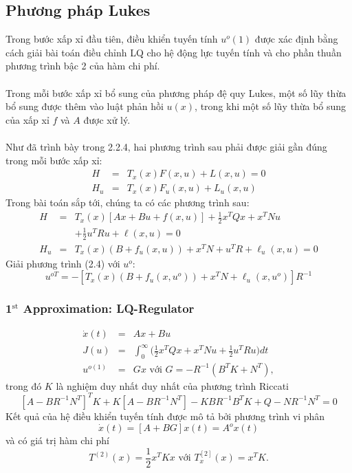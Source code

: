 \documentclass[12pt,a4paper]{report}
\begin{document}
\subsection{Phương pháp Lukes} Trong bước xấp xỉ đầu tiên, điều khiển tuyến tính $u^o(1)$ được xác định bằng cách giải bài toán điều chỉnh LQ cho hệ động lực tuyến tính và cho phần thuần phương trình bậc 2 của hàm chi phí. \\\\ Trong mỗi bước xấp xỉ bổ sung của phương pháp đệ quy Lukes, một số lũy thừa bổ sung được thêm vào luật phản hồi $u(x)$, trong khi một số lũy thừa bổ sung của xấp xỉ $f$ và $A$ được xử lý.\\\\ Như đã trình bày trong 2.2.4, hai phương trình sau phải được giải gần đúng trong mỗi bước xấp xỉ: \begin{eqnarray}
	H &=& T_x(x)F(x, u) + L(x, u) = 0\\ H_u &=& T_x(x)F_u(x, u) + L_u(x, u)
\end{eqnarray} Trong bài toán sắp tới, chúng ta có các phương trình sau: \begin{eqnarray}
	H &=&T_x(x)[Ax+Bu+f(x, u)] + \frac{1}{2}x^TQx + x^TNu \nonumber\\ && + \frac{1}{2}u^TRu + \ell(x, u) = 0\\ H_u &=& T_x(x)(B + f_u(x, u)) + x^TN + u^TR + \ell_u(x, u) = 0
\end{eqnarray}
Giải phương trình (2.4) với $u^o$: \begin{equation}
	u^{oT} = -[T_x(x)(B + f_u(x, u^o)) + x^TN + \ell_u(x, u^o)]R^{-1}
\end{equation}
\subsubsection{1$^\text{st}$ Approximation: LQ-Regulator} \begin{eqnarray}
	\dot{x}(t) &=& Ax + Bu \nonumber \\
	J(u) &=& \int_{0}^{\infty}\bigg(\frac{1}{2}x^TQx + x^TNu + \frac{1}{2}u^TRu\bigg)dt \nonumber \\ u^{o(1)} &=& Gx \text{ với } G = -R^{-1}(B^TK + N^T), \nonumber
\end{eqnarray} trong đó $K$ là nghiệm duy nhất duy nhất của phương trình Riccati $$[A-BR^{-1}N^T]^TK + K[A-BR^{-1}N^T] - KBR^{-1}B^TK + Q - NR^{-1}N^T = 0$$ Kết quả của hệ điều khiển tuyến tính được mô tả bởi phương trình vi phân $$\dot{x}(t) = [A + BG]x(t) = A^ox(t)$$ và có giá trị hàm chi phí $$T^{(2)}(x) = \frac{1}{2}x^TKx \text{ với } T_x^{[2]}(x) = x^TK.$$
\end{document}
